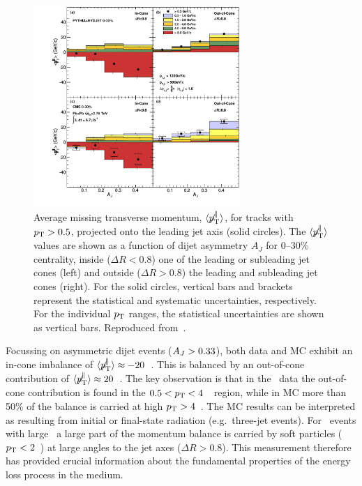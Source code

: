 \begin{figure}[!h]
\begin{center}
\includegraphics[width=0.7\textwidth]{jetfigures/missingPtParallel-Corrected-data-InConeOutConeDPhiCut_ntv6_2.pdf}
\caption{Average missing transverse momentum,
$\langle \displaystyle{\not} p_{\mathrm{T}}^{\parallel} \rangle$,
for tracks with $\mbox{$p_{\mathrm{T}}$} > 0.5$\GeVc, projected onto the leading jet axis (solid circles).
The $\langle \displaystyle{\not} p_{\mathrm{T}}^{\parallel} \rangle$ values are 
shown as a function of dijet asymmetry
$A_J$ for 0--30\% centrality, inside ($\Delta R < 0.8$) one of the leading or subleading jet cones (left) and
outside ($\Delta R > 0.8$) the leading and subleading jet cones (right).
For the solid circles, vertical bars and brackets represent
the statistical and systematic uncertainties, respectively.
For the individual $\mbox{$p_{\mathrm{T}}$}$ ranges, the statistical uncertainties are shown as vertical bars.
Reproduced from~\cite{Chatrchyan:2011sx}.}
\label{fig:GR:CMS_missingpT}
\end{center}
\end{figure}

Focussing on asymmetric dijet events ($A_J > 0.33$), both data and MC exhibit an
 in-cone imbalance of $\langle \displaystyle{\not} p_{\mathrm{T}}^{\parallel} \rangle \approx
-20$~\GeVc. This is balanced by an out-of-cone contribution of
$\langle \displaystyle{\not} p_{\mathrm{T}}^{\parallel} \rangle \approx 20$~\GeVc. The key 
observation is that in the \PbPb\ data the out-of-cone contribution is found in the $0.5 < \mbox{$p_{\mathrm{T}}$} < 4$~\GeVc\ region, 
while in MC more than 50\% of the balance is carried at high $\mbox{$p_{\mathrm{T}}$} > 4$~\GeVc. The MC 
results can be interpreted as resulting from initial or final-state radiation (e.g.\ three-jet events).
For \PbPb\ events with large \AJ\ a large part of the momentum balance is 
carried by soft particles ($\mbox{$p_{\mathrm{T}}$} < 2$~\GeVc) at large angles to the jet axes ($\Delta R > 0.8$). This measurement
therefore has provided crucial information about the fundamental properties of the energy loss process 
in the medium.

